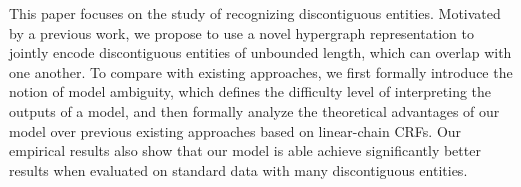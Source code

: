 This paper focuses on the study of recognizing discontiguous entities. Motivated by a previous work, we propose to use a novel hypergraph representation to jointly encode discontiguous entities of unbounded length, which can overlap with one another. To compare with existing approaches, we first formally introduce the notion of model ambiguity, which defines the difficulty level of interpreting the outputs of a model, and then formally analyze the theoretical advantages of our model over previous existing approaches based on linear-chain CRFs. Our empirical results also show that our model is able achieve significantly better results when evaluated on standard data with many discontiguous entities.
